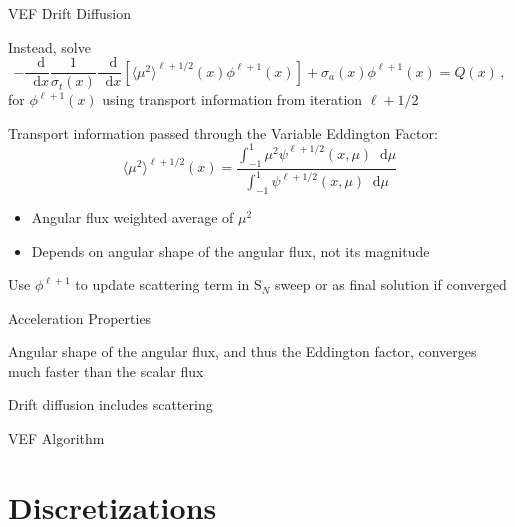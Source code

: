 \documentclass[10pt]{beamer}
\newcommand{\SN}{S$_N$\xspace}
\newcommand{\ud}{\mathop{}\!\mathrm{d}} %
\newcommand{\dderiv}[2]{\frac{\ud #1}{\ud #2}}
\newcommand{\edd}{\langle \mu^2 \rangle}
\newcommand{\relll}{^{\ell+1}} %
\newcommand{\rellh}{^{\ell+1/2}} %
\newcommand{\bracket}[1]{\left[ #1 \right]}
\begin{document}
\begin{frame}{VEF Drift Diffusion}

	Instead, solve 
	\begin{equation*} \label{eq:drift}
	-\dderiv{}{x} \frac{1}{\sigma_t(x)} \dderiv{}{x} \bracket{\edd\rellh(x)\phi\relll(x)} + \sigma_a(x) \phi\relll(x) = Q(x) \,,
	\end{equation*}
	for $\phi\relll(x)$ using transport information from iteration $\ell+1/2$

	\pause 
	Transport information passed through the \alert{Variable Eddington Factor:}
	\begin{equation*} \label{eq:eddington} 
		\edd\rellh(x) = \frac{\int_{-1}^1 \mu^2 \psi\rellh(x, \mu) \ud \mu}{\int_{-1}^1 \psi\rellh(x, \mu) \ud \mu}
	\end{equation*}

	\begin{itemize}
		\pause
		\item Angular flux weighted average of $\mu^2$ 

		\pause
		\item Depends on angular shape of the angular flux, not its magnitude 
	\end{itemize}

	\pause
	Use $\phi\relll$ to update scattering term in \SN sweep or as final solution if converged 

\end{frame}

\begin{frame}{Acceleration Properties}

	Angular shape of the angular flux, and thus the Eddington factor, converges much faster than the scalar flux 

	Drift diffusion includes scattering 

\end{frame}

\begin{frame}{VEF Algorithm}

	\begin{figure}

		\only<2>{\def\svgwidth{.8\textwidth}}

	\end{figure}

\end{frame}

\section{Discretizations}
\end{document}

